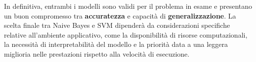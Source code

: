 In definitiva, entrambi i modelli sono validi per il problema in esame e presentano un buon compromesso tra \textbf{accuratezza} e capacità di \textbf{generalizzazione}. La scelta finale tra Naive Bayes e SVM dipenderà da considerazioni specifiche relative all'ambiente applicativo, come la disponibilità di risorse computazionali, la necessità di interpretabilità del modello e la priorità data a una leggera miglioria nelle prestazioni rispetto alla velocità di esecuzione.




